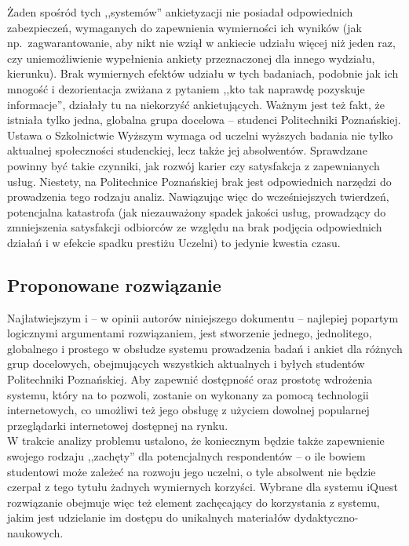 Żaden spośród tych ,,systemów'' ankietyzacji nie posiadał odpowiednich zabezpieczeń, wymaganych do zapewnienia wymierności ich wyników (jak np.~zagwarantowanie, aby nikt nie wziął w ankiecie udziału więcej niż jeden raz, czy uniemożliwienie wypełnienia ankiety przeznaczonej dla innego wydziału, kierunku). Brak wymiernych efektów udziału w tych badaniach, podobnie jak ich mnogość i dezorientacja zwiżana z pytaniem ,,kto tak naprawdę pozyskuje informacje'', działały tu na niekorzyść ankietujących. Ważnym jest też fakt, że istniała tylko jedna, globalna grupa docelowa -- studenci Politechniki Poznańskiej. \\

Ustawa o Szkolnictwie Wyższym wymaga od uczelni wyższych badania nie tylko aktualnej społeczności studenckiej, lecz także jej absolwentów\cite{AP:PoSW05}. Sprawdzane powinny być takie czynniki, jak rozwój karier czy satysfakcja z zapewnianych usług. Niestety, na Politechnice Poznańskiej brak jest odpowiednich narzędzi do prowadzenia tego rodzaju analiz. Nawiązując więc do wcześniejszych twierdzeń, potencjalna katastrofa (jak niezauważony spadek jakości usług, prowadzący do zmniejszenia satysfakcji odbiorców ze względu na brak podjęcia odpowiednich działań i w efekcie spadku prestiżu Uczelni) to jedynie kwestia czasu. \\

\subsection{Proponowane rozwiązanie}
\label{Chapter112}

Najłatwiejszym i -- w opinii autorów niniejszego dokumentu -- najlepiej popartym logicznymi argumentami rozwiązaniem, jest stworzenie jednego, jednolitego, globalnego i prostego w obsłudze systemu prowadzenia badań i ankiet dla różnych grup docelowych, obejmujących wszystkich aktualnych i byłych studentów Politechniki Poznańskiej. Aby zapewnić dostępność oraz prostotę wdrożenia systemu, który na to pozwoli, zostanie on wykonany za pomocą technologii internetowych, co umożliwi też jego obsługę z użyciem dowolnej popularnej przeglądarki internetowej dostępnej na rynku. \\

W trakcie analizy problemu ustalono, że koniecznym będzie także zapewnienie swojego rodzaju ,,zachęty'' dla potencjalnych respondentów -- o ile bowiem studentowi może zależeć na rozwoju jego uczelni, o tyle absolwent nie będzie czerpał z tego tytułu żadnych wymiernych korzyści. Wybrane dla systemu iQuest rozwiązanie obejmuje więc też element zachęcający do korzystania z systemu, jakim jest udzielanie im dostępu do unikalnych materiałów dydaktyczno-naukowych. \\

